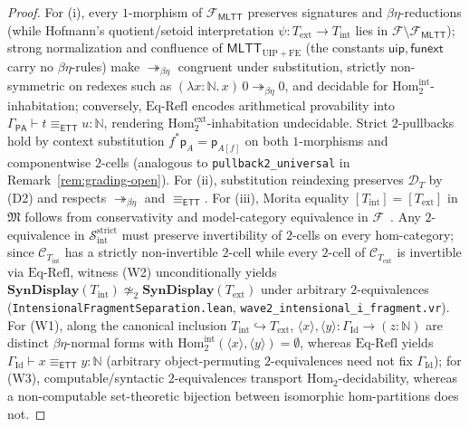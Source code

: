 \documentclass[11pt]{article}
\theoremstyle{plain}
\theoremstyle{definition}
\newcommand{\cF}{\mathcal{F}}
\newcommand{\cC}{\mathcal{C}}
\newcommand{\cD}{\mathcal{D}}
\newcommand{\fM}{\mathfrak{M}}
\newcommand{\Hom}{\mathrm{Hom}}
\newcommand{\PA}{\mathsf{PA}}
\newcommand{\MLTT}{\mathsf{MLTT}}
\newcommand{\ETT}{\mathsf{ETT}}
\begin{document}
\begin{proof}
For (i), every $1$-morphism of $\mathcal{F}_{\MLTT}$ preserves signatures and $\beta\eta$-reductions (while Hofmann's quotient/setoid interpretation $\psi : T_{\mathrm{ext}} \to T_{\mathrm{int}}$ lies in $\cF \setminus \mathcal{F}_{\MLTT}$); strong normalization and confluence of $\MLTT_{\mathrm{UIP}+\mathrm{FE}}$ (the constants $\mathsf{uip}, \mathsf{funext}$ carry no $\beta\eta$-rules) make $\twoheadrightarrow_{\beta\eta}$ congruent under substitution, strictly non-symmetric on redexes such as $(\lambda x:\mathbb{N}.\,x)\,0 \twoheadrightarrow_{\beta\eta} 0$, and decidable for $\Hom_2^{\mathrm{int}}$-inhabitation; conversely, $\text{Eq-Refl}$ encodes arithmetical provability into $\Gamma_{\PA} \vdash t \equiv_{\ETT} u : \mathbb{N}$, rendering $\Hom_2^{\mathrm{ext}}$-inhabitation undecidable. Strict $2$-pullbacks hold by context substitution $f^*\mathsf{p}_A = \mathsf{p}_{A[f]}$ on both $1$-morphisms and componentwise $2$-cells (analogous to \texttt{pullback2\_\allowbreak universal} in Remark~\ref{rem:grading-open}). For (ii), substitution reindexing preserves $\cD_T$ by (D2) and respects $\twoheadrightarrow_{\beta\eta}$ and $\equiv_{\ETT}$. For (iii), Morita equality $[T_{\mathrm{int}}] = [T_{\mathrm{ext}}]$ in $\fM$ follows from conservativity and model-category equivalence in $\cF$~\cite{Hofmann1995,KapulkinLi2025}. Any $2$-equivalence in $\mathcal{S}_{\mathrm{int}}^{\mathrm{strict}}$ must preserve invertibility of $2$-cells on every hom-category; since $\cC_{T_{\mathrm{int}}}$ has a strictly non-invertible $2$-cell while every $2$-cell of $\cC_{T_{\mathrm{ext}}}$ is invertible via $\text{Eq-Refl}$, witness (W2) unconditionally yields $\mathbf{SynDisplay}(T_{\mathrm{int}}) \not\simeq_2 \mathbf{SynDisplay}(T_{\mathrm{ext}})$ under arbitrary $2$-equivalences (\texttt{IntensionalFragmentSeparation.lean}, \texttt{wave2\_intensional\_i\_fragment.vr}). For (W1), along the canonical inclusion $T_{\mathrm{int}} \hookrightarrow T_{\mathrm{ext}}$, $\langle x \rangle, \langle y \rangle : \Gamma_{\mathrm{Id}} \to (z:\mathbb{N})$ are distinct $\beta\eta$-normal forms with $\Hom_2^{\mathrm{int}}(\langle x \rangle, \langle y \rangle) = \emptyset$, whereas $\text{Eq-Refl}$ yields $\Gamma_{\mathrm{Id}} \vdash x \equiv_{\ETT} y : \mathbb{N}$ (arbitrary object-permuting $2$-equivalences need not fix $\Gamma_{\mathrm{Id}}$); for (W3), computable/syntactic $2$-equivalences transport $\Hom_2$-decidability, whereas a non-computable set-theoretic bijection between isomorphic hom-partitions does not.
\end{proof}
\end{document}
